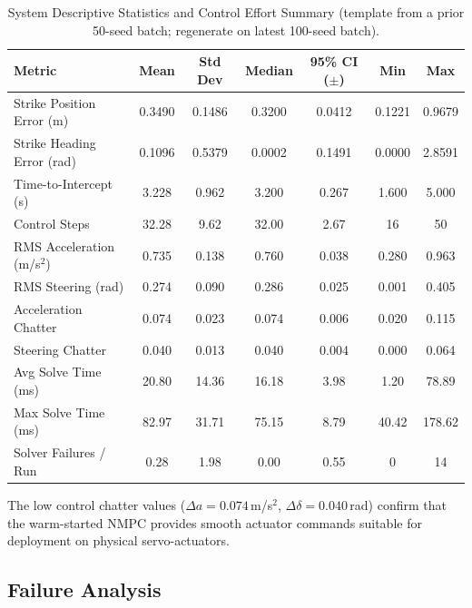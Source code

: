 \documentclass[10pt,twocolumn,letterpaper]{article}
\begin{document}
\begin{table}[t]
\centering
\caption{System Descriptive Statistics and Control Effort Summary (template from a prior 50-seed batch; regenerate on latest 100-seed batch).}
\label{tab:descriptive}
\begin{tabular}{@{}lcccccc@{}}
\toprule
\textbf{Metric} & \textbf{Mean} & \textbf{Std Dev} & \textbf{Median} & \textbf{95\% CI ($\pm$)} & \textbf{Min} & \textbf{Max} \\ \midrule
Strike Position Error (m)      & 0.3490 & 0.1486 & 0.3200 & 0.0412 & 0.1221 & 0.9679 \\
Strike Heading Error (rad)     & 0.1096 & 0.5379 & 0.0002 & 0.1491 & 0.0000 & 2.8591 \\
Time-to-Intercept (s)          & 3.228  & 0.962  & 3.200  & 0.267  & 1.600  & 5.000  \\
Control Steps                  & 32.28  & 9.62   & 32.00  & 2.67   & 16     & 50     \\
RMS Acceleration (m/s$^2$)     & 0.735  & 0.138  & 0.760  & 0.038  & 0.280  & 0.963  \\
RMS Steering (rad)             & 0.274  & 0.090  & 0.286  & 0.025  & 0.001  & 0.405  \\
Acceleration Chatter           & 0.074  & 0.023  & 0.074  & 0.006  & 0.020  & 0.115  \\
Steering Chatter               & 0.040  & 0.013  & 0.040  & 0.004  & 0.000  & 0.064  \\
Avg Solve Time (ms)            & 20.80  & 14.36  & 16.18  & 3.98   & 1.20   & 78.89  \\
Max Solve Time (ms)            & 82.97  & 31.71  & 75.15  & 8.79   & 40.42  & 178.62 \\
Solver Failures / Run          & 0.28   & 1.98   & 0.00   & 0.55   & 0      & 14     \\
\bottomrule
\end{tabular}
\end{table}

The low control chatter values ($\Delta a = 0.074$\,m/s$^2$,
$\Delta\delta = 0.040$\,rad) confirm that the warm-started NMPC
provides smooth actuator commands suitable for deployment on physical
servo-actuators.

\subsection{Failure Analysis}
\end{document}
